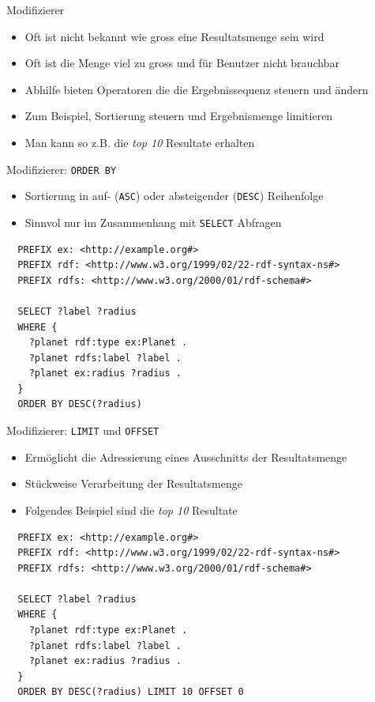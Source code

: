 \documentclass{beamer}
\begin{document}
\begin{frame}{Modifizierer}
	
	\begin{itemize}
		\item Oft ist nicht bekannt wie gross eine Resultatsmenge sein wird
		\item Oft ist die Menge viel zu gross und für Benutzer nicht brauchbar
		\item Abhilfe bieten Operatoren die die Ergebnissequenz steuern und ändern
		\item Zum Beispiel, Sortierung steuern und Ergebnismenge limitieren
		\item Man kann so z.B. die \emph{top 10} Resultate erhalten
	\end{itemize}
	
\end{frame}

\begin{frame}[fragile]{Modifizierer: \texttt{ORDER BY}}
	
	\begin{itemize}
		\item Sortierung in auf- (\texttt{ASC}) oder absteigender (\texttt{DESC}) Reihenfolge
		\item Sinnvol nur im Zusammenhang mit \texttt{SELECT} Abfragen
	\end{itemize}
	
	\small
	\begin{lstlisting}
  PREFIX ex: <http://example.org#> 
  PREFIX rdf: <http://www.w3.org/1999/02/22-rdf-syntax-ns#>
  PREFIX rdfs: <http://www.w3.org/2000/01/rdf-schema#>
	
  SELECT ?label ?radius
  WHERE {
    ?planet rdf:type ex:Planet .
    ?planet rdfs:label ?label .
    ?planet ex:radius ?radius .
  }
  ORDER BY DESC(?radius)
	\end{lstlisting}
	
\end{frame}

\begin{frame}[fragile]{Modifizierer: \texttt{LIMIT} und \texttt{OFFSET}}
	
	\begin{itemize}
		\item Ermöglicht die Adressierung eines Ausschnitts der Resultatsmenge
		\item Stückweise Verarbeitung der Resultatsmenge
		\item Folgendes Beispiel sind die \emph{top 10} Resultate
	\end{itemize}
	
	\small
	\begin{lstlisting}
  PREFIX ex: <http://example.org#> 
  PREFIX rdf: <http://www.w3.org/1999/02/22-rdf-syntax-ns#>
  PREFIX rdfs: <http://www.w3.org/2000/01/rdf-schema#>
	
  SELECT ?label ?radius
  WHERE {
    ?planet rdf:type ex:Planet .
    ?planet rdfs:label ?label .
    ?planet ex:radius ?radius .
  }
  ORDER BY DESC(?radius) LIMIT 10 OFFSET 0
	\end{lstlisting}
	
\end{frame}
\end{document}
